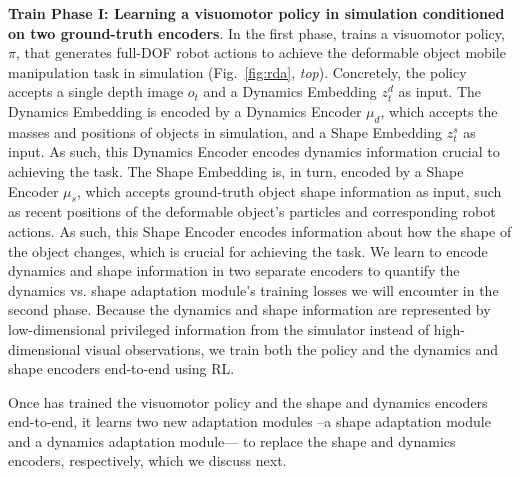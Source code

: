\textbf{Train Phase I: Learning a visuomotor policy in simulation conditioned on two ground-truth encoders}.
In the first phase, \methodname{} trains a visuomotor policy, $\pi$, that generates full-DOF robot actions to achieve the deformable object mobile manipulation task in simulation (Fig.~\ref{fig:rda}, \textit{top}). Concretely, the policy accepts a single depth image $o_t$ and a Dynamics Embedding $z_t^{d}$ as input. The Dynamics Embedding is encoded by a Dynamics Encoder $\mu_{d}$, which accepts the masses and positions of objects in simulation, and a Shape Embedding $z_t^{s}$ as input. As such, this Dynamics Encoder encodes dynamics information crucial to achieving the task. The Shape Embedding is, in turn, encoded by a Shape Encoder $\mu_{s}$, which accepts ground-truth object shape information as input, such as recent positions of the deformable object's particles and corresponding robot actions. As such, this Shape Encoder encodes information about how the shape of the object changes, which is crucial for achieving the task. We learn to encode dynamics and shape information in two separate encoders to quantify the dynamics vs. shape adaptation module's training losses we will encounter in the second phase. Because the dynamics and shape information are represented by low-dimensional privileged information from the simulator instead of high-dimensional visual observations, we train both the policy and the dynamics and shape encoders end-to-end using RL. 

Once \methodname{} has trained the visuomotor policy and the shape and dynamics encoders end-to-end, it learns two new adaptation modules --a shape adaptation module and a dynamics adaptation module--- to replace the shape and dynamics encoders, respectively, which we discuss next. 

